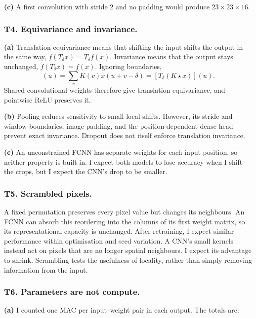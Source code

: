 \documentclass[11pt]{article}
\begin{document}
\textbf{(c)} A first convolution with stride 2 and no padding would produce $23\times23\times16$.

\subsubsection*{T4. Equivariance and invariance.}

\textbf{(a)} Translation equivariance means that shifting the input shifts the output in the same way, $f(T_\delta x)=T_\delta f(x)$. Invariance means that the output stays unchanged, $f(T_\delta x)=f(x)$. Ignoring boundaries,
\begin{equation}
[K\star T_\delta x](u)=\sum_v K(v)x(u+v-\delta)
=[T_\delta(K\star x)](u).
\end{equation}
Shared convolutional weights therefore give translation equivariance, and pointwise ReLU preserves it.

\textbf{(b)} Pooling reduces sensitivity to small local shifts. However, its stride and window boundaries, image padding, and the position-dependent dense head prevent exact invariance. Dropout does not itself enforce translation invariance.

\textbf{(c)} An unconstrained FCNN has separate weights for each input position, so neither property is built in. I expect both models to lose accuracy when I shift the crops, but I expect the CNN's drop to be smaller.

\subsubsection*{T5. Scrambled pixels.}

A fixed permutation preserves every pixel value but changes its neighbours. An FCNN can absorb this reordering into the columns of its first weight matrix, so its representational capacity is unchanged. After retraining, I expect similar performance within optimisation and seed variation. A CNN's small kernels instead act on pixels that are no longer spatial neighbours. I expect its advantage to shrink. Scrambling tests the usefulness of locality, rather than simply removing information from the input.

\subsubsection*{T6. Parameters are not compute.}

\textbf{(a)} I counted one MAC per input--weight pair in each output. The totals are:
\end{document}
